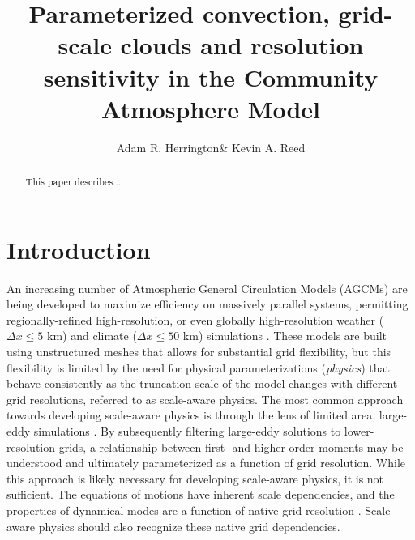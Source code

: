 \documentclass[times]{qjrms4}
\begin{document}

\title{Parameterized convection, grid-scale clouds and resolution sensitivity in the Community Atmosphere Model}

\author{Adam R. Herrington\corrauth \& Kevin A. Reed}
\address{School of Marine and Atmospheric Sciences, Stony Brook University, Stony Brook, NY 11794}


\begin{abstract}
This paper describes...
\end{abstract}


\maketitle

\section{Introduction}

An increasing number of Atmospheric General Circulation Models (AGCMs) are being developed to maximize efficiency on massively parallel systems, permitting regionally-refined high-resolution, or even globally high-resolution weather ($\Delta x \leq 5$ km) and climate ($\Delta x \leq 50$ km) simulations \citep{SMTMN2008JCP,MPASatm,Z2014QJRMS,HETAL2016JCLIM,DCMIP16,LetAl2018JAMES}. These models are built using unstructured meshes that allows for substantial grid flexibility, but this flexibility is limited by the need for physical parameterizations ({\em{physics}}) that behave consistently as the truncation scale of the model changes with different grid resolutions, referred to as scale-aware physics. The most common approach towards developing scale-aware physics is through the lens of limited area, large-eddy simulations \citep[e.g.,][]{PC2008JAS,AW2013JAS,SZ2018JCLIM}. By subsequently filtering large-eddy solutions to lower-resolution grids, a relationship between first- and higher-order moments \citep{G1992JFM} may be understood and ultimately parameterized as a function of grid resolution. While this approach is likely necessary for developing scale-aware physics, it is not sufficient. The equations of motions have inherent scale dependencies, and the properties of dynamical modes are a function of native grid resolution \citep{O1981JAS,WETAL1997MWR,PG2006JAS,JR2016QJRMS}. Scale-aware physics should also recognize these native grid dependencies.
\end{document}
